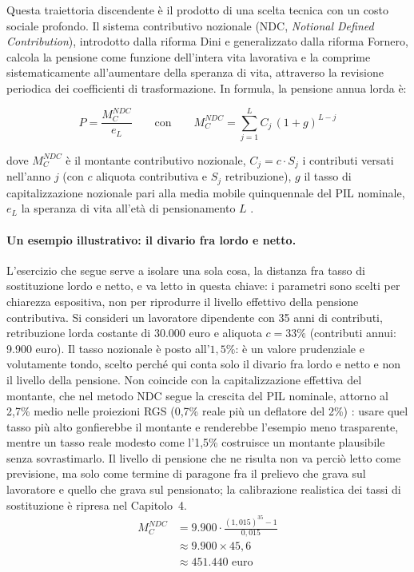 Questa traiettoria discendente è il prodotto di una scelta tecnica con un costo
sociale profondo. Il sistema contributivo nozionale (NDC,
\emph{Notional Defined Contribution}), introdotto dalla riforma Dini e
generalizzato dalla riforma Fornero, calcola la pensione come funzione dell'intera
vita lavorativa e la comprime sistematicamente all'aumentare della speranza di
vita, attraverso la revisione periodica dei coefficienti di trasformazione.
In formula, la pensione annua lorda è:

\begin{equation}
P = \frac{M_C^{NDC}}{e_L}
\qquad \text{con} \qquad
M_C^{NDC} = \sum_{j=1}^{L} C_j \,(1+g)^{L-j}
\label{eq:ndc}
\end{equation}

\noindent dove $M_C^{NDC}$ è il montante contributivo nozionale,
$C_j = c \cdot S_j$ i contributi versati nell'anno $j$
(con $c$ aliquota contributiva e $S_j$ retribuzione),
$g$ il tasso di capitalizzazione nozionale pari alla media mobile quinquennale
del PIL nominale, $e_L$ la speranza di vita all'età di pensionamento $L$
\cite{Bosi2018, MEF_RGS2025}.

\paragraph{Un esempio illustrativo: il divario fra lordo e netto.}
L'esercizio che segue serve a isolare una sola cosa, la distanza fra tasso di
sostituzione lordo e netto, e va letto in questa chiave: i parametri sono scelti
per chiarezza espositiva, non per riprodurre il livello effettivo della pensione
contributiva. Si consideri un lavoratore dipendente con 35 anni di contributi,
retribuzione lorda costante di 30.000 euro e aliquota $c = 33\%$ (contributi
annui: 9.900 euro). Il tasso nozionale è posto all'$1{,}5\%$: è un valore
prudenziale e volutamente tondo, scelto perché qui conta solo il divario fra lordo
e netto e non il livello della pensione. Non coincide con la capitalizzazione
effettiva del montante, che nel metodo NDC segue la crescita del PIL nominale,
attorno al 2,7\% medio nelle proiezioni RGS (0,7\% reale più un deflatore del 2\%)
\cite{MEF_RGS2025_NdA}: usare quel tasso più alto gonfierebbe il montante e
renderebbe l'esempio meno trasparente, mentre un tasso reale modesto come l'1,5\%
costruisce un montante plausibile senza sovrastimarlo. Il livello di pensione che
ne risulta non va perciò letto come previsione, ma solo come termine di paragone
fra il prelievo che grava sul lavoratore e quello che grava sul pensionato; la
calibrazione realistica dei tassi di sostituzione è ripresa nel Capitolo~4.
\[
\begin{aligned}
M_C^{NDC}
  &= 9.900 \cdot \frac{(1{,}015)^{35} - 1}{0{,}015} \\
  &\approx 9.900 \times 45{,}6 \\
  &\approx 451.440 \text{ euro}
\end{aligned}
\]

